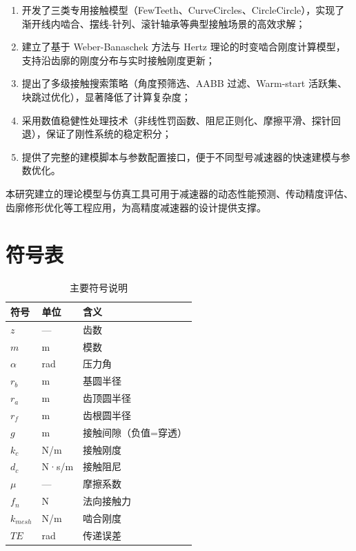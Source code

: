 \documentclass[12pt]{ctexart}
\begin{document}
\begin{enumerate}
  \item 开发了三类专用接触模型（FewTeeth、CurveCircles、CircleCircle），实现了渐开线内啮合、摆线-针列、滚针轴承等典型接触场景的高效求解；
  
  \item 建立了基于 Weber-Banaschek 方法与 Hertz 理论的时变啮合刚度计算模型，支持沿齿廓的刚度分布与实时接触刚度更新；
  
  \item 提出了多级接触搜索策略（角度预筛选、AABB 过滤、Warm-start 活跃集、块跳过优化），显著降低了计算复杂度；
  
  \item 采用数值稳健性处理技术（非线性罚函数、阻尼正则化、摩擦平滑、探针回退），保证了刚性系统的稳定积分；
  
  \item 提供了完整的建模脚本与参数配置接口，便于不同型号减速器的快速建模与参数优化。
\end{enumerate}

本研究建立的理论模型与仿真工具可用于减速器的动态性能预测、传动精度评估、齿廓修形优化等工程应用，为高精度减速器的设计提供支撑。




\appendix
\section{符号表}

\begin{table}[htbp]
\centering
\small
\begin{tabular}{lll}
\toprule
符号 & 单位 & 含义 \\ 
\midrule
$z$ & — & 齿数 \\ 
$m$ & m & 模数 \\ 
$\alpha$ & rad & 压力角 \\ 
$r_b$ & m & 基圆半径 \\ 
$r_a$ & m & 齿顶圆半径 \\ 
$r_f$ & m & 齿根圆半径 \\ 
$g$ & m & 接触间隙（负值=穿透） \\ 
$k_c$ & N/m & 接触刚度 \\ 
$d_c$ & N·s/m & 接触阻尼 \\ 
$\mu$ & — & 摩擦系数 \\ 
$f_n$ & N & 法向接触力 \\ 
$k_{mesh}$ & N/m & 啮合刚度 \\ 
$TE$ & rad & 传递误差 \\ 
\bottomrule
\end{tabular}
\caption{主要符号说明}
\end{table}
\end{document}
